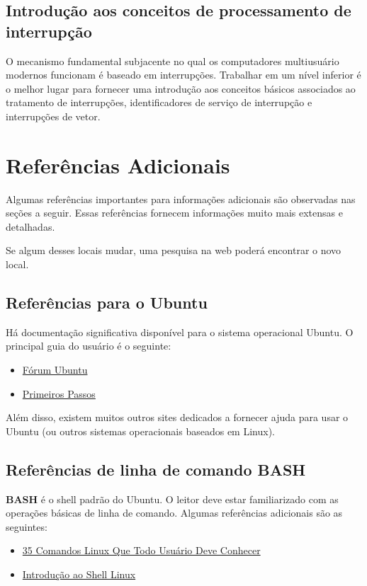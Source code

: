 \subsection{Introdução aos conceitos de processamento de interrupção}
O mecanismo fundamental subjacente no qual os computadores multiusuário modernos funcionam é baseado em interrupções. Trabalhar em um nível inferior é o melhor lugar para fornecer uma introdução aos conceitos básicos associados ao tratamento de interrupções, identificadores de serviço de interrupção e interrupções de vetor.

\section{Referências Adicionais}
Algumas referências importantes para informações adicionais são observadas nas seções a seguir. Essas referências fornecem informações muito mais extensas e detalhadas.

Se algum desses locais mudar, uma pesquisa na web poderá encontrar o novo local.

\subsection{Referências para o Ubuntu}
Há documentação significativa disponível para o sistema operacional Ubuntu. O principal guia do usuário é o seguinte:
\begin{itemize}
	\item \href{https://ubuntuforum-br.org/}{Fórum Ubuntu}
	\item \href{https://help.ubuntu.com/stable/ubuntu-help/getting-started.html}{Primeiros Passos}
\end{itemize}

Além disso, existem muitos outros sites dedicados a fornecer ajuda para usar o Ubuntu (ou outros sistemas operacionais baseados em Linux).

\subsection{Referências de linha de comando BASH}
\textbf{BASH} é o shell padrão do Ubuntu. O leitor deve estar familiarizado com as operações básicas de linha de comando. Algumas referências adicionais são as seguintes:
\begin{itemize}
	\item \href{https://www.hostinger.com.br/tutoriais/comandos-linux}{35 Comandos Linux Que Todo Usuário Deve Conhecer}
	\item \href{http://leg.ufpr.br/~fernandomayer/aulas/ce083/shell-linux.html}{Introdução ao Shell Linux}
\end{itemize}

